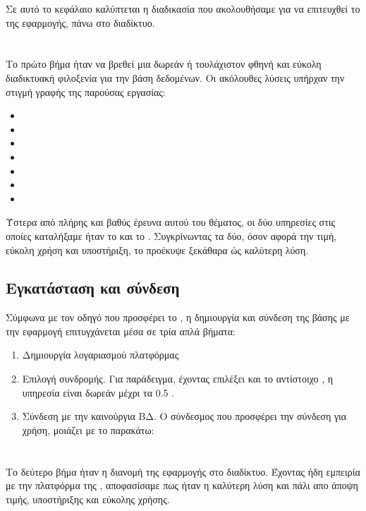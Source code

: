 \quad Σε αυτό το κεφάλαιο καλύπτεται η διαδικασία που ακολουθήσαμε για να επιτευχθεί το  της  εφαρμογής, πάνω στο διαδίκτυο.
\section{}
\quad Το πρώτο βήμα ήταν να βρεθεί μια δωρεάν ή τουλάχιστον φθηνή και εύκολη διαδικτυακή φιλοξενία για την  βάση δεδομένων. Οι ακόλουθες λύσεις υπήρχαν την στιγμή γραφής της παρούσας εργασίας:
\begin{itemize}
    \item {}
    \item {}
    \item {}
    \item {}
    \item {}
    \item {}
    \item {}
\end{itemize}
\quad Ύστερα από πλήρης και βαθύς έρευνα αυτού του θέματος, οι δύο υπηρεσίες στις οποίες καταλήξαμε ήταν το  και το . Συγκρίνωντας τα δύο, όσον αφορά την τιμή, εύκολη χρήση και υποστήριξη, το  προέκυψε ξεκάθαρα ώς καλύτερη λύση.
\subsection*{Εγκατάσταση και σύνδεση}
\quad Σύμφωνα με τον οδηγό που προσφέρει το , η δημιουργία και σύνδεση της βάσης με την εφαρμογή επιτυγχάνεται μέσα σε τρία απλά βήματα:
\begin{enumerate}
    \item Δημιουργία λογαριασμού πλατφόρμας
    \item Επιλογή συνδρομής. Για παράδειγμα, έχοντας επιλέξει  και το αντίστοιχο , η υπηρεσία είναι δωρεάν μέχρι τα 0.5 .
    \item Σύνδεση με την καινούργια ΒΔ. Ο σύνδεσμος που προσφέρει την σύνδεση για χρήση, μοιάζει με το παρακάτω:\par
    \quad {}
\end{enumerate}


\section{}
\quad Το δεύτερο βήμα ήταν η διανομή της εφαρμογής στο διαδίκτυο. Έχοντας ήδη εμπειρία με την  πλατφόρμα της , αποφασίσαμε πως ήταν η καλύτερη λύση και πάλι απο άποψη τιμής, υποστήριξης και εύκολης χρήσης.

